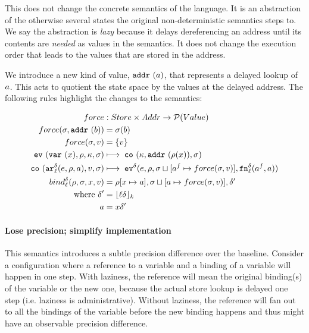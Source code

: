 \documentclass[preprint,onecolumn,9pt]{sigplanconf} %
\begin{document}
This does not change the concrete semantics of the language. It is an
abstraction of the otherwise several states the original
non-deterministic semantics steps to. We say the abstraction is
\emph{lazy} because it delays dereferencing an address until its
contents are \emph{needed} as values in the semantics. It does not
change the execution order that leads to the values that are stored in
the address.

We introduce a new kind of value, $\saddr{\maddr}$, that represents a
delayed lookup of $\maddr$. This acts to quotient the state space by
the values at the delayed address. The following rules highlight the
changes to the semantics:

\begin{align*}
force &: Store \times Addr \to \Set(Value) \\
force(\msto,\saddr\maddralt) &= \msto(\maddralt)\\
force(\msto,\mval) &= \{\mval\}\\
\ev{\svar{\mvar},\menv,\mkont,\msto} &\machstep\;
\co{\mkont,\saddr{\menv(\mvar)},\msto} \\
\co{\kar[^\mcntr_\mlab]{\mexp,\menv,\maddr},\mval,\msto}
&\machstep\;
\ev[^\mcntr]{\mexp,\menv,\msto\sqcup[\maddr^f \mapsto force(\msto,\mval)],\kfn[^\mcntr_\mlab]{\maddr^f,\maddr}} \\
bind^\mcntr_\mlab(\menv,\msto,\mvar,\mval) &= \menv[\mvar \mapsto
  \maddr], \msto\sqcup[\maddr \mapsto force(\msto, \mval)], \mcntr' \\
\mbox{where } \mcntr' &= \lfloor\mlab\mcntr\rfloor_k \\
              \maddr &= \mvar\mcntr'
\end{align*}

\paragraph{Lose precision; simplify implementation}
This semantics introduces a subtle precision difference over the
baseline. Consider a configuration where a reference to a variable and
a binding of a variable will happen in one step. With laziness, the
reference will mean the original binding(s) of the variable or the new
one, because the actual store lookup is delayed one step
(i.e. laziness is administrative). Without laziness, the reference
will fan out to all the bindings of the variable before the new
binding happens and thus might have an observable precision
difference.
\end{document}
